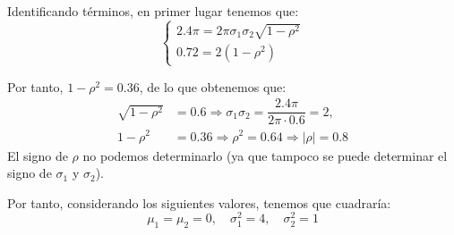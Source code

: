 \begin{ejercicio}
\begin{enumerate}
        Identificando términos, en primer lugar tenemos que:
        \begin{equation*}
            \begin{cases}
                2.4\pi=2\pi\sigma_1\sigma_2\sqrt{1-\rho^2}\\
                0.72=2(1-\rho^2)
            \end{cases}
        \end{equation*}

        Por tanto, $1-\rho^2=0.36$, de lo que obtenemos que:
        \begin{align*}
            \sqrt{1-\rho^2} &= 0.6 \Longrightarrow \sigma_1\sigma_2 = \dfrac{2.4\pi}{2\pi\cdot 0.6} = 2,\\
            1-\rho^2 &= 0.36 \Longrightarrow \rho^2 = 0.64 \Longrightarrow |\rho|= 0.8
        \end{align*}
        El signo de $\rho$ no podemos determinarlo (ya que tampoco se puede determinar el signo de $\sigma_1$ y $\sigma_2$).


        Por tanto, considerando los siguientes valores, tenemos que cuadraría:
        \begin{equation*}
            \mu_1=\mu_2=0,\quad \sigma_1^2=4,\quad \sigma_2^2=1
        \end{equation*}

    \end{enumerate}
\end{ejercicio}


